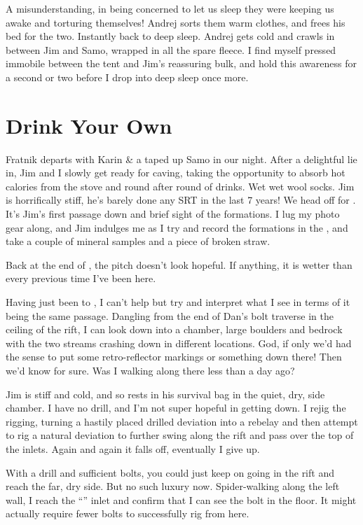 A misunderstanding, in being concerned to let us sleep they were keeping
us awake and torturing themselves! Andrej sorts them warm clothes, and
frees his bed for the two. Instantly back to deep sleep. Andrej gets
cold and crawls in between Jim and Samo, wrapped in all the spare
fleece. I find myself pressed immobile between the tent and Jim's
reassuring bulk, and hold this awareness for a second or two before I
drop into deep sleep once more.



\section{Drink Your Own}

Fratnik departs with Karin \& a taped up Samo in our night. After a
delightful lie in, Jim and I slowly get ready for caving, taking the
opportunity to absorb hot calories from the stove and round after round
of drinks. Wet wet wool socks. Jim is horrifically stiff, he's barely
done any SRT in the last 7 years! We head off for .
It's Jim's first passage down  and brief sight of the
formations. I lug my photo gear along, and Jim indulges me as I try and
record the formations in the , and take a couple of mineral
samples and a piece of broken straw.

Back at the end of , the pitch doesn't look hopeful. If
anything, it is wetter than every previous time I've been here.

Having just been to , I can't help but try and interpret
what I see in terms of it being the same passage. Dangling from the end
of Dan's bolt traverse in the ceiling of the rift, I can look down into
a chamber, large boulders and bedrock with the two streams crashing down
in different locations. God, if only we'd had the sense to put some
retro-reflector markings or something down there! Then we'd know for
sure. Was I walking along there less than a day ago?

Jim is stiff and cold, and so rests in his survival bag in the quiet,
dry, side chamber. I have no drill, and I'm not super hopeful in getting
down. I rejig the rigging, turning a hastily placed drilled deviation
into a rebelay and then attempt to rig a natural deviation to further
swing along the rift and pass over the top of the inlets. Again and
again it falls off, eventually I give up.

With a drill and sufficient bolts, you could just keep on going in the
rift and reach the far, dry side. But no such luxury now. Spider-walking
along the left wall, I reach the ``'' inlet and confirm
that I can see the bolt in the floor. It might actually require fewer
bolts to successfully rig from here.

